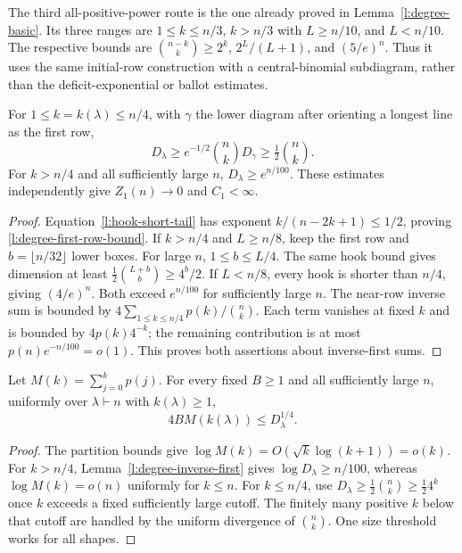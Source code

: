 The third all-positive-power route is the one already proved in
Lemma~\ref{l:degree-basic}.  Its three ranges are $1\le k\le n/3$,
$k>n/3$ with $L\ge n/10$, and $L<n/10$.  The respective bounds are
$\binom{n-k}k\ge2^k$, $2^L/(L+1)$, and $(5/e)^n$.
Thus it uses the same initial-row construction with a central-binomial
subdiagram, rather than the deficit-exponential or ballot estimates.


\begin{lemma}
\label{l:degree-inverse-first}
For $1\le k=k(\lambda)\le n/4$, with $\gamma$ the lower diagram
after orienting a longest line as the first row,
\begin{equation}\label{l:degree-first-row-bound}
 D_\lambda\ge e^{-1/2}\binom nkD_\gamma
                  \ge\tfrac12\binom nk.
\end{equation}
For $k>n/4$ and all sufficiently large $n$,
$D_\lambda\ge e^{n/100}$.  These estimates independently give
$Z_1(n)\to0$ and $C_1<\infty$.
\end{lemma}
\begin{proof}
Equation~\eqref{l:hook-short-tail} has exponent
$k/(n-2k+1)\le1/2$, proving \eqref{l:degree-first-row-bound}.
If $k>n/4$ and $L\ge n/8$, keep the first row and
$b=\lfloor n/32\rfloor$ lower boxes.  For large $n$, $1\le b\le L/4$.
The same hook bound gives dimension at least
$\frac12\binom{L+b}b\ge4^b/2$.
If $L<n/8$, every hook is shorter than $n/4$, giving $(4/e)^n$.
Both exceed $e^{n/100}$ for sufficiently large $n$.
The near-row inverse sum is bounded by
$4\sum_{1\le k\le n/4}p(k)/\binom nk$.
Each term vanishes at fixed $k$ and is bounded by $4p(k)4^{-k}$;
the remaining contribution is at most $p(n)e^{-n/100}=o(1)$.
This proves both assertions about inverse-first sums.
\end{proof}

\begin{lemma}\label{l:degree-type-absorption}
Let $M(k)=\sum_{j=0}^kp(j)$.  For every fixed $B\ge1$ and all
sufficiently large $n$, uniformly over $\lambda\vdash n$ with
$k(\lambda)\ge1$,
\begin{equation}\label{l:degree-type-absorption-equation}
 4B M(k(\lambda))\le D_\lambda^{1/4}.
\end{equation}
\end{lemma}
\begin{proof}
The partition bounds give $\log M(k)=O(\sqrt k\log(k+1))=o(k)$.
For $k>n/4$, Lemma~\ref{l:degree-inverse-first} gives
$\log D_\lambda\ge n/100$, whereas $\log M(k)=o(n)$ uniformly
for $k\le n$.  For $k\le n/4$, use
$D_\lambda\ge\frac12\binom nk\ge\frac12 4^k$ once $k$ exceeds
a fixed sufficiently large cutoff.  The finitely many positive $k$
below that cutoff are handled by the uniform divergence of
$\binom nk$.  One size threshold works for all shapes.
\end{proof}
